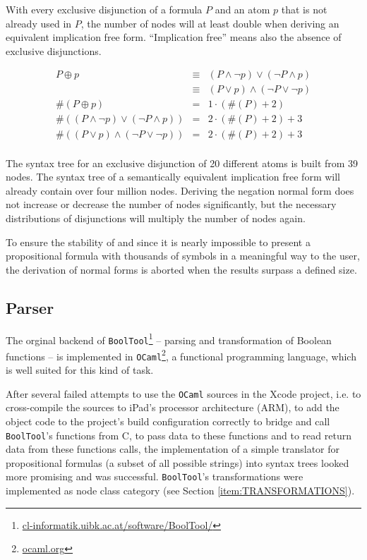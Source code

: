 With every exclusive disjunction of a formula $P$ and an atom $p$
that is not already used in $P$,
the number of nodes will at least double 
when deriving an equivalent implication free form.
“Implication free” means also the absence of exclusive disjunctions. %

\begin{eqnarray*}
P \oplus p & \equiv & (P \wedge \neg p) \vee  (\neg P \wedge p) \\
& \equiv & (P \vee p) \wedge  (\neg P \vee \neg p) \\
\#(P \oplus p) & = & 1 \cdot(\#(P) + 2) \\
\#((P \wedge \neg p) \vee  (\neg P \wedge p)) & = & 2 \cdot (\#(P) + 2) + 3 \\
\#((P \vee p) \wedge  (\neg P \vee \neg p)) & = & 2 \cdot (\#(P) + 2) + 3 \\
\end{eqnarray*}

The syntax tree for an exclusive disjunction of 20 different atoms is built from 39 nodes.
The syntax tree of a semantically equivalent implication free form will already contain over four million nodes.
Deriving the negation normal form does not increase or decrease the number of nodes significantly,
but the necessary distributions of disjunctions will multiply the number of nodes again.

To ensure the stability of \Nyaya 
and since it is nearly impossible 
to present a propositional formula 
with thousands of symbols 
in a meaningful way
to the user, 
the derivation of normal forms is aborted when the results surpass a defined size.



\subsection{Parser}
\label{sec:Parser}

The orginal backend of \verb+BoolTool+\footnote{
\href{http://cl-informatik.uibk.ac.at/software/BoolTool/}{cl-informatik.uibk.ac.at/software/BoolTool/}} 
– parsing and transformation of Boolean functions – 
is implemented in \verb+OCaml+\footnote{
\href{http://ocaml.org}{ocaml.org}}, 
a functional programming language, which is well suited for this kind of task.

After several failed attempts to use the \verb+OCaml+ sources in the Xcode project, 
i.e. to cross-compile the sources to iPad's processor architecture (ARM),
to add the object code to the project's build configuration correctly 
to bridge and call \verb+BoolTool+'s functions from C, 
to pass data to these functions and to read return data from these functions calls,
the implementation of a simple translator 
for propositional formulas (a subset of all possible strings)
into syntax trees looked more promising and was successful. 
\verb=BoolTool='s transformations were implemented as node class category (see Section \vref{item:TRANSFORMATIONS}).

